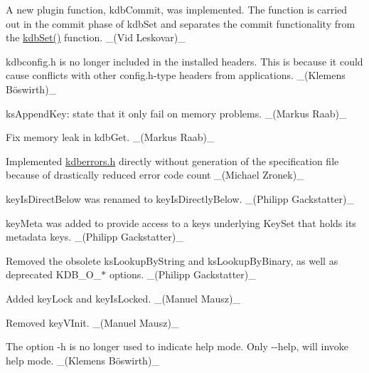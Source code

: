 \begin{DoxyItemize}
\item A new plugin function, {\ttfamily kdb\+Commit}, was implemented. The function is carried out in the {\ttfamily commit} phase of {\ttfamily kdb\+Set} and separates the commit functionality from the {\ttfamily \mbox{\hyperlink{group__kdb_ga11436b058408f83d303ca5e996832bcf}{kdb\+Set()}}} function. \+\_\+(\+Vid Leskovar)\+\_\+
\item {\ttfamily kdbconfig.\+h} is no longer included in the installed headers. This is because it could cause conflicts with other {\ttfamily config.\+h}-\/type headers from applications. \+\_\+(Klemens Böswirth)\+\_\+
\item {\ttfamily ks\+Append\+Key}\+: state that it only fail on memory problems. \+\_\+(\+Markus Raab)\+\_\+
\item Fix memory leak in {\ttfamily kdb\+Get}. \+\_\+(\+Markus Raab)\+\_\+
\item Implemented {\ttfamily \mbox{\hyperlink{kdberrors_8h}{kdberrors.\+h}}} directly without generation of the {\ttfamily specification} file because of drastically reduced error code count \+\_\+(\+Michael Zronek)\+\_\+
\item {\ttfamily key\+Is\+Direct\+Below} was renamed to {\ttfamily key\+Is\+Directly\+Below}. \+\_\+(\+Philipp Gackstatter)\+\_\+
\item {\ttfamily key\+Meta} was added to provide access to a key\textquotesingle{}s underlying Key\+Set that holds its metadata keys. \+\_\+(\+Philipp Gackstatter)\+\_\+
\item Removed the obsolete {\ttfamily ks\+Lookup\+By\+String} and {\ttfamily ks\+Lookup\+By\+Binary}, as well as deprecated {\ttfamily K\+D\+B\+\_\+\+O\+\_\+$\ast$} options. \+\_\+(\+Philipp Gackstatter)\+\_\+
\item Added {\ttfamily key\+Lock} and {\ttfamily key\+Is\+Locked}. \+\_\+(\+Manuel Mausz)\+\_\+
\item Removed {\ttfamily key\+V\+Init}. \+\_\+(\+Manuel Mausz)\+\_\+
\end{DoxyItemize}


\begin{DoxyItemize}
\item The option {\ttfamily -\/h} is no longer used to indicate help mode. Only {\ttfamily -\/-\/help}, will invoke help mode. \+\_\+(Klemens Böswirth)\+\_\+
\end{DoxyItemize}


